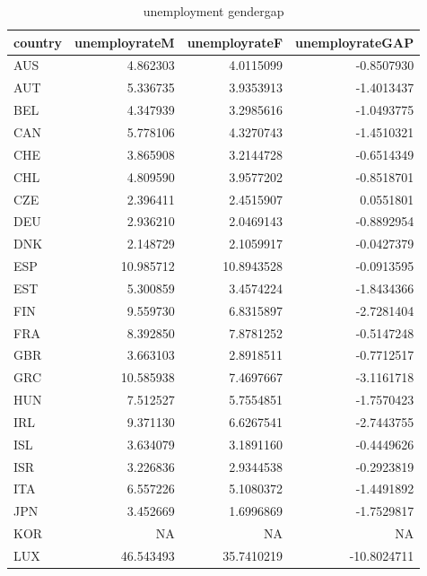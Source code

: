 \documentclass[11pt,a4paper,]{article}
\begin{document}
\begin{table}[H]

\caption{\label{tab:unnamed-chunk-9}unemployment gendergap}
\centering
\begin{tabular}[t]{l|r|r|r}
\hline
country & unemployrateM & unemployrateF & unemployrateGAP\\
\hline
\rowcolor{gray!6}  AUS & 4.862303 & 4.0115099 & -0.8507930\\
\hline
AUT & 5.336735 & 3.9353913 & -1.4013437\\
\hline
\rowcolor{gray!6}  BEL & 4.347939 & 3.2985616 & -1.0493775\\
\hline
CAN & 5.778106 & 4.3270743 & -1.4510321\\
\hline
\rowcolor{gray!6}  CHE & 3.865908 & 3.2144728 & -0.6514349\\
\hline
CHL & 4.809590 & 3.9577202 & -0.8518701\\
\hline
\rowcolor{gray!6}  CZE & 2.396411 & 2.4515907 & 0.0551801\\
\hline
DEU & 2.936210 & 2.0469143 & -0.8892954\\
\hline
\rowcolor{gray!6}  DNK & 2.148729 & 2.1059917 & -0.0427379\\
\hline
ESP & 10.985712 & 10.8943528 & -0.0913595\\
\hline
\rowcolor{gray!6}  EST & 5.300859 & 3.4574224 & -1.8434366\\
\hline
FIN & 9.559730 & 6.8315897 & -2.7281404\\
\hline
\rowcolor{gray!6}  FRA & 8.392850 & 7.8781252 & -0.5147248\\
\hline
GBR & 3.663103 & 2.8918511 & -0.7712517\\
\hline
\rowcolor{gray!6}  GRC & 10.585938 & 7.4697667 & -3.1161718\\
\hline
HUN & 7.512527 & 5.7554851 & -1.7570423\\
\hline
\rowcolor{gray!6}  IRL & 9.371130 & 6.6267541 & -2.7443755\\
\hline
ISL & 3.634079 & 3.1891160 & -0.4449626\\
\hline
\rowcolor{gray!6}  ISR & 3.226836 & 2.9344538 & -0.2923819\\
\hline
ITA & 6.557226 & 5.1080372 & -1.4491892\\
\hline
\rowcolor{gray!6}  JPN & 3.452669 & 1.6996869 & -1.7529817\\
\hline
KOR & NA & NA & NA\\
\hline
\rowcolor{gray!6}  LUX & 46.543493 & 35.7410219 & -10.8024711\\

\end{tabular}
\end{table}
\end{document}
